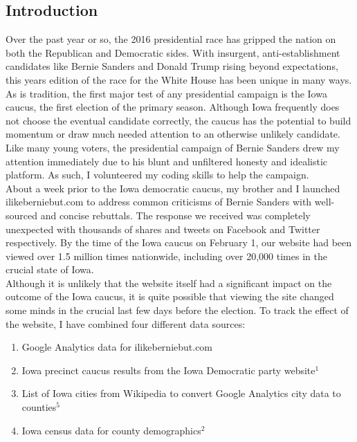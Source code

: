 \documentclass[11pt]{article}
\begin{document}
\begin{multicols}{2}

\section{Introduction}

Over the past year or so, the 2016 presidential race has gripped the nation on both the Republican and Democratic sides. With insurgent, anti-establishment candidates like Bernie Sanders and Donald Trump rising beyond expectations, this years edition of the race for the White House has been unique in many ways. \\

As is tradition, the first major test of any presidential campaign is the Iowa caucus, the first election of the primary season. Although Iowa frequently does not choose the eventual candidate correctly, the caucus has the potential to build momentum or draw much needed attention to an otherwise unlikely candidate. \\ 

Like many young voters, the presidential campaign of Bernie Sanders drew my attention immediately due to his blunt and unfiltered honesty and idealistic platform. As such, I volunteered my coding skills to help the campaign. \\

About a week prior to the Iowa democratic caucus, my brother and I launched ilikeberniebut.com to address common criticisms of Bernie Sanders with well-sourced and concise rebuttals. The response we received was completely unexpected with thousands of shares and tweets on Facebook and Twitter respectively. By the time of the Iowa caucus on February 1, our website had been viewed over 1.5 million times nationwide, including over 20,000 times in the crucial state of Iowa. \\

Although it is unlikely that the website itself had a significant impact on the outcome of the Iowa caucus, it is quite possible that viewing the site changed some minds in the crucial last few days before the election. To track the effect of the website, I have combined four different data sources: \\

\begin{enumerate}
    \item Google Analytics data for ilikeberniebut.com
    \item Iowa precinct caucus results from the Iowa Democratic party website$^1$
    \item List of Iowa cities from Wikipedia to convert Google Analytics city data to counties$^5$
    \item Iowa census data for county demographics$^2$
\end{enumerate}
 

\end{multicols}
\end{document}
